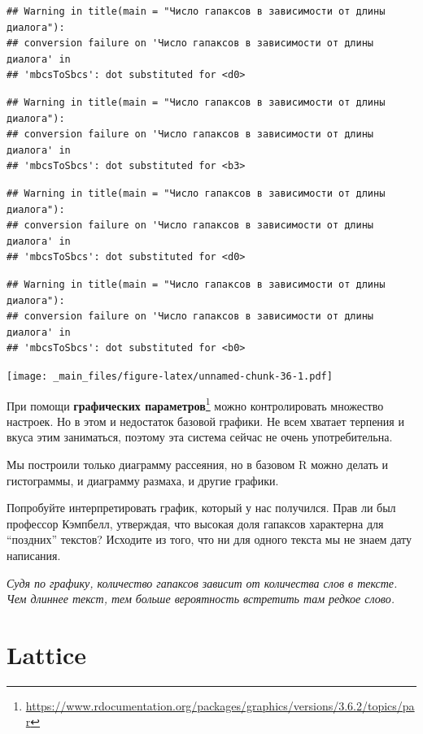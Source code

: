 \documentclass[
]{book}
\theoremstyle{definition}
\theoremstyle{definition}
\theoremstyle{definition}
\theoremstyle{definition}
\theoremstyle{remark}
\begin{document}
\begin{verbatim}
## Warning in title(main = "Число гапаксов в зависимости от длины диалога"):
## conversion failure on 'Число гапаксов в зависимости от длины диалога' in
## 'mbcsToSbcs': dot substituted for <d0>
\end{verbatim}

\begin{verbatim}
## Warning in title(main = "Число гапаксов в зависимости от длины диалога"):
## conversion failure on 'Число гапаксов в зависимости от длины диалога' in
## 'mbcsToSbcs': dot substituted for <b3>
\end{verbatim}

\begin{verbatim}
## Warning in title(main = "Число гапаксов в зависимости от длины диалога"):
## conversion failure on 'Число гапаксов в зависимости от длины диалога' in
## 'mbcsToSbcs': dot substituted for <d0>
\end{verbatim}

\begin{verbatim}
## Warning in title(main = "Число гапаксов в зависимости от длины диалога"):
## conversion failure on 'Число гапаксов в зависимости от длины диалога' in
## 'mbcsToSbcs': dot substituted for <b0>
\end{verbatim}

\texttt{[image: \_main\_files/figure-latex/unnamed-chunk-36-1.pdf]}

При помощи \textbf{графических параметров}\footnote{\url{https://www.rdocumentation.org/packages/graphics/versions/3.6.2/topics/par}} можно контролировать множество настроек. Но в этом и недостаток базовой графики. Не всем хватает терпения и вкуса этим заниматься, поэтому эта система сейчас не очень употребительна.

Мы построили только диаграмму рассеяния, но в базовом R можно делать и гистограммы, и диаграмму размаха, и другие графики.

Попробуйте интерпретировать график, который у нас получился. Прав ли был профессор Кэмпбелл, утверждая, что высокая доля гапаксов характерна для ``поздних'' текстов? Исходите из того, что ни для одного текста мы не знаем дату написания.

{\emph{Судя по графику, количество гапаксов зависит от количества слов в тексте. Чем длиннее текст, тем больше вероятность встретить там редкое слово.}}

\hypertarget{lattice}{%
\section{Lattice}\label{lattice}}
\end{document}
